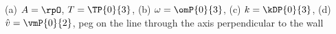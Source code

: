 (a) $A = \rpO$, $T = \TP{0}{3}$, (b) $\omega = \omP{0}{3}$, (c) $k = \kDP{0}{3}$, (d) $\hat v = \vmP{0}{2}$, peg on the line through the axis perpendicular to the wall
